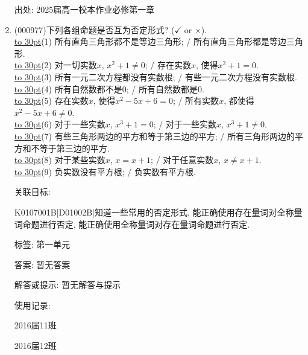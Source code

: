 \documentclass[10pt,a4paper]{article}
\newcommand{\blank}[1]{\underline{\hbox to #1pt{}}}
\begin{document}
\begin{enumerate}[1.]
出处: 2025届高一校本作业必修第一章
\item { (000977)}下列各组命题是否互为否定形式? ($\checkmark$ or $\times$).\\ 
\blank{30}(1) 所有直角三角形都不是等边三角形; / 所有直角三角形都是等边三角形.\\ 
\blank{30}(2) 对一切实数$x$, $x^2+1 \ne 0$; / 存在实数$x$, 使得$x^2+1=0$.\\ 
\blank{30}(3) 所有一元二次方程都没有实数根; / 有些一元二次方程没有实数根.\\ 
\blank{30}(4) 所有自然数都不是$0$; / 所有自然数都是$0$.\\ 
\blank{30}(5) 存在实数$x$, 使得$x^2-5x+6=0$; / 所有实数$x$, 都使得$x^2-5x+6\ne 0$.\\ 
\blank{30}(6) 对于一些实数$x$, $x^3+1=0$; / 对于一些实数$x$, $x^3+1\ne 0$.\\ 
\blank{30}(7) 有些三角形两边的平方和等于第三边的平方; / 所有三角形两边的平方和不等于第三边的平方.\\ 
\blank{30}(8) 对于某些实数$x$, $x=x+1$; / 对于任意实数$x$, $x \ne x+1$.\\ 
\blank{30}(9) 负实数没有平方根; / 负实数有平方根.


关联目标:

K0107001B|D01002B|知道一些常用的否定形式, 能正确使用存在量词对全称量词命题进行否定, 能正确使用全称量词对存在量词命题进行否定.



标签: 第一单元

答案: 暂无答案

解答或提示: 暂无解答与提示

使用记录:

2016届11班									

2016届12班									



\end{enumerate}
\end{document}

